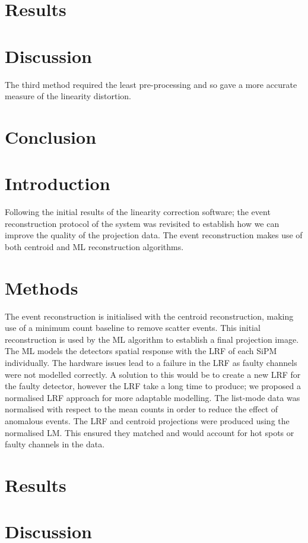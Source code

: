 \section{Results}

\section{Discussion}
The third method required the least pre-processing and so gave a more accurate measure of the linearity distortion.
\section{Conclusion}



\section{Introduction}
Following the initial results of the linearity correction software; the event reconstruction protocol of the system was revisited to  establish how we can improve the quality of the projection data. The event reconstruction makes use of both centroid and ML reconstruction algorithms. 
\section{Methods}
The event reconstruction is initialised with the centroid reconstruction, making use of a minimum count baseline to remove scatter events. This initial reconstruction is used by the ML algorithm to establish a final projection image. The ML models the detectors spatial response with the LRF of each SiPM individually. The hardware issues lead to a failure in the LRF as faulty channels were not modelled correctly. A solution to this would be to create a new LRF for the faulty detector, however the LRF take a long time to produce; we proposed a normalised LRF approach for more adaptable modelling. The list-mode data was normalised with respect to the mean counts in order to reduce the effect of anomalous events. The LRF and centroid projections were produced using the normalised LM. This ensured they matched and would account for hot spots or faulty channels in the data.
\section{Results}

\section{Discussion}

